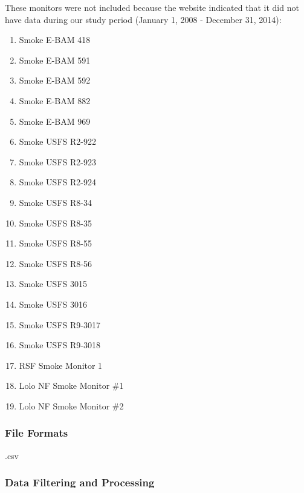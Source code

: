 

These monitors were not included because the website indicated that it did not have data during our study period (January 1, 2008 - December 31, 2014):
\begin{enumerate}[nolistsep]
\item Smoke E-BAM 418
\item Smoke E-BAM 591
\item Smoke E-BAM 592
\item Smoke E-BAM 882
\item Smoke E-BAM 969
\item Smoke USFS R2-922 
\item Smoke USFS R2-923
\item Smoke USFS R2-924 
\item Smoke USFS R8-34 
\item Smoke USFS R8-35
\item Smoke USFS R8-55 
\item Smoke USFS R8-56 
\item Smoke USFS 3015 
\item Smoke USFS 3016 
\item Smoke USFS R9-3017
\item Smoke USFS R9-3018 
\item RSF Smoke Monitor 1
\item Lolo NF Smoke Monitor \#1 
\item Lolo NF Smoke Monitor \#2 

\end{enumerate}

\subsubsection*{File Formats} 
.csv

\subsubsection*{Data Filtering and Processing}


